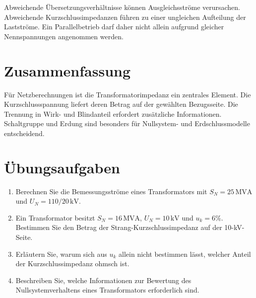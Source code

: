 Abweichende Übersetzungsverhältnisse können Ausgleichsströme verursachen.
Abweichende Kurzschlussimpedanzen führen zu einer ungleichen Aufteilung
der Lastströme. Ein Parallelbetrieb darf daher nicht allein aufgrund
gleicher Nennspannungen angenommen werden.

\section{Zusammenfassung}

Für Netzberechnungen ist die Transformatorimpedanz ein zentrales Element.
Die Kurzschlussspannung liefert deren Betrag auf der gewählten Bezugsseite.
Die Trennung in Wirk- und Blindanteil erfordert zusätzliche Informationen.
Schaltgruppe und Erdung sind besonders für Nullsystem- und Erdschlussmodelle
entscheidend.

\section{Übungsaufgaben}

\begin{enumerate}
  \item Berechnen Sie die Bemessungsströme eines Transformators mit
        \(S_N=25\,\mathrm{MVA}\) und \(U_N=110/20\,\mathrm{kV}\).
  \item Ein Transformator besitzt \(S_N=16\,\mathrm{MVA}\),
        \(U_N=10\,\mathrm{kV}\) und \(u_k=6\%\).
        Bestimmen Sie den Betrag der Strang-Kurzschlussimpedanz auf der
        10-kV-Seite.
  \item Erläutern Sie, warum sich aus \(u_k\) allein nicht bestimmen lässt,
        welcher Anteil der Kurzschlussimpedanz ohmsch ist.
  \item Beschreiben Sie, welche Informationen zur Bewertung des
        Nullsystemverhaltens eines Transformators erforderlich sind.
\end{enumerate}
